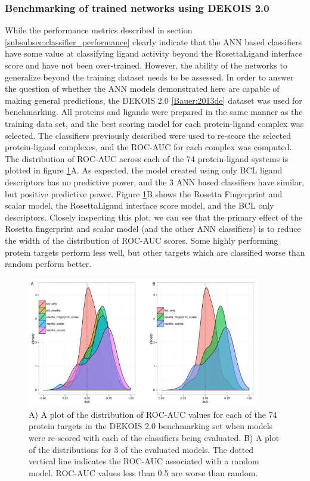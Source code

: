 \subsubsection{Benchmarking of trained networks using DEKOIS 2.0}
While the performance metrics described in section \ref{subsubsec:classifier_performance} clearly indicate that the \ac{ANN} based classifiers have some value at classifying ligand activity beyond the RosettaLigand interface score and have not been over-trained.
However, the ability of the networks to generalize beyond the training dataset needs to be assessed.
In order to answer the question of whether the \ac{ANN} models demonstrated here are capable of making general predictions, the DEKOIS 2.0 \ref{Bauer:2013de} dataset was used for benchmarking. 
All proteins and ligands were prepared in the same manner as the training data set, and the best scoring model for each protein-ligand complex was selected.
The classifiers previously described were used to re-score the selected protein-ligand complexes, and the \ac{ROC-AUC} for each complex was computed. 
The distribution of \ac{ROC-AUC} across each of the 74 protein-ligand systems is plotted in figure \ref{fig:dekois_roc_all}A.
As expected, the model created using only \ac{BCL} ligand descriptors has no predictive power, and the 3 \ac{ANN} based classifiers have similar, but positive predictive power.
Figure \ref{fig:dekois_roc_all}B shows the Rosetta Fingerprint and scalar model, the RosettaLigand interface score model, and the \ac{BCL} only descriptors.
Closely inspecting this plot, we can see that the primary effect of the Rosetta fingerprint and scalar model (and the other \ac{ANN} classifiers) is to reduce the width of the distribution of \ac{ROC-AUC} scores.  Some highly performing protein targets perform less well, but other targets which are classified worse than random perform better. 

\begin{figure}
\centering
\includegraphics[width=4in]{figures/hts/auc_distributions.pdf}
\caption{
A) A plot of the distribution of \acs{ROC-AUC} values for each of the 74 protein targets in the DEKOIS 2.0 benchmarking set when models were re-scored with each of the classifiers being evaluated.
B) A plot of the distributions for 3 of the evaluated models.
The dotted vertical line indicates the \acs{ROC-AUC} associated with a random model.
\acs{ROC-AUC} values less than 0.5 are worse than random. 
}
\label{fig:dekois_roc_all}
\end{figure}

